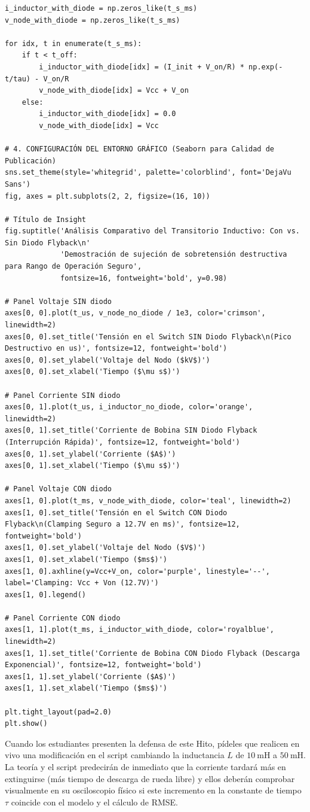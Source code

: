 \documentclass[11pt, a4paper]{article}
\begin{document}
\begin{lstlisting}
i_inductor_with_diode = np.zeros_like(t_s_ms)
v_node_with_diode = np.zeros_like(t_s_ms)

for idx, t in enumerate(t_s_ms):
    if t < t_off:
        i_inductor_with_diode[idx] = (I_init + V_on/R) * np.exp(-t/tau) - V_on/R
        v_node_with_diode[idx] = Vcc + V_on
    else:
        i_inductor_with_diode[idx] = 0.0
        v_node_with_diode[idx] = Vcc

# 4. CONFIGURACIÓN DEL ENTORNO GRÁFICO (Seaborn para Calidad de Publicación)
sns.set_theme(style='whitegrid', palette='colorblind', font='DejaVu Sans')
fig, axes = plt.subplots(2, 2, figsize=(16, 10))

# Título de Insight
fig.suptitle('Análisis Comparativo del Transitorio Inductivo: Con vs. Sin Diodo Flyback\n'
             'Demostración de sujeción de sobretensión destructiva para Rango de Operación Seguro',
             fontsize=16, fontweight='bold', y=0.98)

# Panel Voltaje SIN diodo
axes[0, 0].plot(t_us, v_node_no_diode / 1e3, color='crimson', linewidth=2)
axes[0, 0].set_title('Tensión en el Switch SIN Diodo Flyback\n(Pico Destructivo en us)', fontsize=12, fontweight='bold')
axes[0, 0].set_ylabel('Voltaje del Nodo ($kV$)')
axes[0, 0].set_xlabel('Tiempo ($\mu s$)')

# Panel Corriente SIN diodo
axes[0, 1].plot(t_us, i_inductor_no_diode, color='orange', linewidth=2)
axes[0, 1].set_title('Corriente de Bobina SIN Diodo Flyback (Interrupción Rápida)', fontsize=12, fontweight='bold')
axes[0, 1].set_ylabel('Corriente ($A$)')
axes[0, 1].set_xlabel('Tiempo ($\mu s$)')

# Panel Voltaje CON diodo
axes[1, 0].plot(t_ms, v_node_with_diode, color='teal', linewidth=2)
axes[1, 0].set_title('Tensión en el Switch CON Diodo Flyback\n(Clamping Seguro a 12.7V en ms)', fontsize=12, fontweight='bold')
axes[1, 0].set_ylabel('Voltaje del Nodo ($V$)')
axes[1, 0].set_xlabel('Tiempo ($ms$)')
axes[1, 0].axhline(y=Vcc+V_on, color='purple', linestyle='--', label='Clamping: Vcc + Von (12.7V)')
axes[1, 0].legend()

# Panel Corriente CON diodo
axes[1, 1].plot(t_ms, i_inductor_with_diode, color='royalblue', linewidth=2)
axes[1, 1].set_title('Corriente de Bobina CON Diodo Flyback (Descarga Exponencial)', fontsize=12, fontweight='bold')
axes[1, 1].set_ylabel('Corriente ($A$)')
axes[1, 1].set_xlabel('Tiempo ($ms$)')

plt.tight_layout(pad=2.0)
plt.show()
\end{lstlisting}

\begin{aviso}
Cuando los estudiantes presenten la defensa de este Hito, pídeles que realicen en vivo una modificación en el script cambiando la inductancia $L$ de $\qty{10}{\milli\henry}$ a $\qty{50}{\milli\henry}$. La teoría y el script predecirán de inmediato que la corriente tardará más en extinguirse (más tiempo de descarga de rueda libre) y ellos deberán comprobar visualmente en su osciloscopio físico si este incremento en la constante de tiempo $\tau$ coincide con el modelo y el cálculo de RMSE.
\end{aviso}
\end{document}
